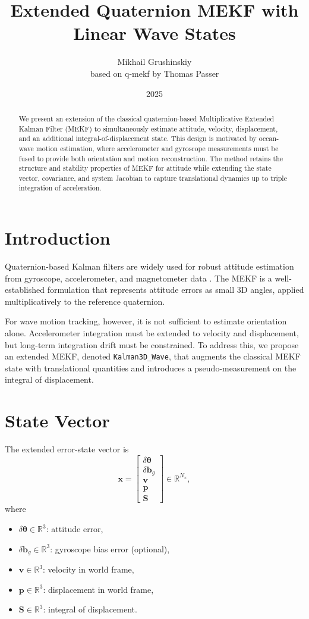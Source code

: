 \documentclass[11pt]{article}
\title{Extended Quaternion MEKF with Linear Wave States}
\author{Mikhail Grushinskiy \\ based on q-mekf by Thomas Passer}
\date{2025}
\begin{document}
\maketitle

\begin{abstract}
We present an extension of the classical quaternion-based Multiplicative Extended Kalman Filter (MEKF) to simultaneously estimate attitude, velocity, displacement, and an additional integral-of-displacement state. This design is motivated by ocean-wave motion estimation, where accelerometer and gyroscope measurements must be fused to provide both orientation and motion reconstruction. The method retains the structure and stability properties of MEKF for attitude while extending the state vector, covariance, and system Jacobian to capture translational dynamics up to triple integration of acceleration.
\end{abstract}

\section{Introduction}
Quaternion-based Kalman filters are widely used for robust attitude estimation from gyroscope, accelerometer, and magnetometer data \cite{crassidis2007survey}. The MEKF is a well-established formulation that represents attitude errors as small 3D angles, applied multiplicatively to the reference quaternion.

For wave motion tracking, however, it is not sufficient to estimate orientation alone. Accelerometer integration must be extended to velocity and displacement, but long-term integration drift must be constrained. To address this, we propose an extended MEKF, denoted \texttt{Kalman3D\_Wave}, that augments the classical MEKF state with translational quantities and introduces a pseudo-measurement on the integral of displacement.

\section{State Vector}
The extended error-state vector is
\begin{equation}
\bm{x} = \begin{bmatrix}
\delta \bm{\theta} \\
\delta \bm{b}_g \\
\bm{v} \\
\bm{p} \\
\bm{S}
\end{bmatrix} \in \mathbb{R}^{N_x},
\end{equation}
where
\begin{itemize}
  \item $\delta \bm{\theta} \in \mathbb{R}^3$: attitude error,
  \item $\delta \bm{b}_g \in \mathbb{R}^3$: gyroscope bias error (optional),
  \item $\bm{v} \in \mathbb{R}^3$: velocity in world frame,
  \item $\bm{p} \in \mathbb{R}^3$: displacement in world frame,
  \item $\bm{S} \in \mathbb{R}^3$: integral of displacement.
\end{itemize}
\end{document}
